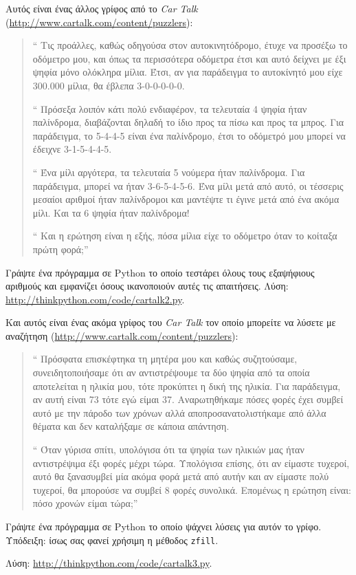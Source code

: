 \documentclass[10pt]{book}
\begin{document}
\begin{exercise}
Αυτός είναι ένας άλλος γρίφος από το {\em Car Talk}
(\url{http://www.cartalk.com/content/puzzlers}):

\begin{quote}
`` Τις προάλλες, καθώς οδηγούσα στον αυτοκινητόδρομο, έτυχε να
προσέξω το οδόμετρο μου, και όπως τα περισσότερα οδόμετρα έτσι και 
αυτό δείχνει με έξι ψηφία μόνο ολόκληρα μίλια. Έτσι, αν για παράδειγμα
το αυτοκίνητό μου είχε 300.000 μίλια, θα έβλεπα 3-0-0-0-0-0.

`` Πρόσεξα λοιπόν κάτι πολύ ενδιαφέρον, τα τελευταία 4 ψηφία ήταν
παλίνδρομα, διαβάζονται δηλαδή το ίδιο προς τα πίσω και προς τα μπρος.
Για παράδειγμα, το 5-4-4-5 είναι ένα παλίνδρομο, έτσι το οδόμετρό
μου μπορεί να έδειχνε 3-1-5-4-4-5.

`` Ένα μίλι αργότερα, τα τελευταία 5 νούμερα ήταν παλίνδρομα. Για παράδειγμα,
μπορεί να ήταν  3-6-5-4-5-6. Ένα μίλι μετά από αυτό, οι τέσσερις μεσαίοι
αριθμοί ήταν παλίνδρομοι και μαντέψτε τι έγινε μετά από ένα ακόμα μίλι. Και τα 6 ψηφία ήταν παλίνδρομα!

`` Και η ερώτηση είναι η εξής, πόσα μίλια είχε το οδόμετρο όταν το κοίταξα πρώτη φορά;''
\end{quote}


Γράψτε ένα πρόγραμμα σε  Python  το οποίο τεστάρει όλους τους εξαψήφιους αριθμούς και εμφανίζει όσους ικανοποιούν αυτές τις απαιτήσεις.
Λύση: \url{http://thinkpython.com/code/cartalk2.py}.
\\
\end{exercise}


\begin{exercise}
Και αυτός είναι ένας ακόμα γρίφος του {\em Car Talk} τον οποίο
μπορείτε να λύσετε με αναζήτηση (\url{http://www.cartalk.com/content/puzzlers}):

\begin{quote}
`` Πρόσφατα επισκέφτηκα τη μητέρα μου και καθώς συζητούσαμε,
συνειδητοποιήσαμε ότι αν αντιστρέψουμε τα δύο ψηφία από τα οποία
αποτελείται η ηλικία μου, τότε προκύπτει η δική της ηλικία. Για παράδειγμα,
αν αυτή είναι 73 τότε εγώ είμαι 37. Αναρωτηθήκαμε πόσες φορές έχει συμβεί
αυτό με την πάροδο των χρόνων αλλά αποπροσανατολιστήκαμε από άλλα θέματα
και δεν καταλήξαμε σε κάποια απάντηση. 

`` Όταν γύρισα σπίτι, υπολόγισα ότι τα ψηφία των ηλικιών μας ήταν αντιστρέψιμα
έξι φορές μέχρι τώρα. Υπολόγισα επίσης, ότι αν είμαστε τυχεροί, αυτό θα ξανασυμβεί μία ακόμα φορά μετά από αυτήν και αν είμαστε πολύ τυχεροί, θα μπορούσε να συμβεί 8 φορές συνολικά. Επομένως η ερώτηση είναι: πόσο χρονών είμαι τώρα;''

\end{quote}

Γράψτε ένα πρόγραμμα σε Python το οποίο ψάχνει λύσεις για αυτόν το γρίφο.
Υπόδειξη: ίσως σας φανεί χρήσιμη η μέθοδος {\tt zfill}.

Λύση: \url{http://thinkpython.com/code/cartalk3.py}.
\end{exercise}
\end{document}
